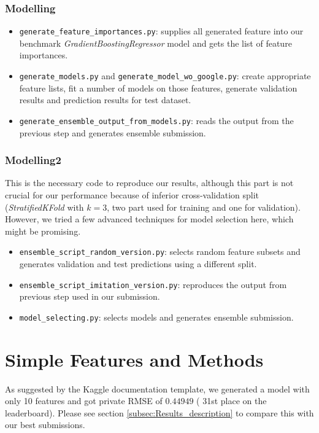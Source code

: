 \documentclass[12pt]{article}
\begin{document}
{{\subsubsection{Modelling}
\begin{itemize}
\item \texttt{generate\_feature\_importances.py}: supplies all generated feature into our benchmark \emph{GradientBoostingRegressor} model and gets the list of feature importances.
\item \texttt{generate\_models.py} and \texttt{generate\_model\_wo\_google.py}: create appropriate feature lists, fit a number of models on those features, generate validation results and prediction results for test dataset.
\item \texttt{generate\_ensemble\_output\_from\_models.py}: reads the output from the previous step and generates ensemble submission.
\end{itemize}

\subsubsection{Modelling2}
This is the necessary code to reproduce our results, although this part is not crucial for our performance because of inferior cross-validation split (\emph{StratifiedKFold} with $k=3$, two part used for training and one for validation). However, we tried a few advanced techniques for model selection here, which might be promising.
\begin{itemize}
\item \texttt{ensemble\_script\_random\_version.py}: selects random feature subsets and generates validation and test predictions using a different split.
\item \texttt{ensemble\_script\_imitation\_version.py}: reproduces the output from previous step used in our submission.
\item \texttt{model\_selecting.py}: selects models and generates ensemble submission.
\end{itemize}




\section{Simple Features and Methods}
\label{sec:simplified}
As suggested by the Kaggle documentation template, we generated a model with only 10 features  and got private RMSE of $0.44949$ ( 31st place on the leaderboard). Please see
section \ref{subsec:Results_description} to compare this with our best submissions.

}}
\end{document}
